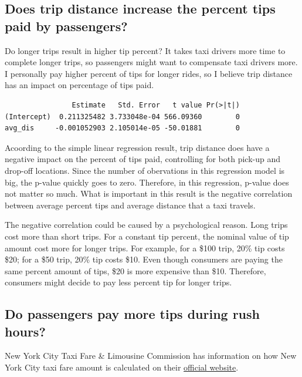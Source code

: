 \documentclass[12pt,twoside]{reedthesis}
\theoremstyle{definition}
\theoremstyle{definition}
\theoremstyle{definition}
\theoremstyle{remark}
\begin{document}
\subsection{Does trip distance increase the percent tips paid by
passengers?}\label{does-trip-distance-increase-the-percent-tips-paid-by-passengers}

Do longer trips result in higher tip percent? It takes taxi drivers more
time to complete longer trips, so passengers might want to compensate
taxi drivers more. I personally pay higher percent of tips for longer
rides, so I believe trip distance has an impact on percentage of tips
paid.
\begin{verbatim}
                Estimate   Std. Error   t value Pr(>|t|)
(Intercept)  0.211325482 3.733048e-04 566.09360        0
avg_dis     -0.001052903 2.105014e-05 -50.01881        0
\end{verbatim}
Acoording to the simple linear regression result, trip distance does
have a negative impact on the percent of tips paid, controlling for both
pick-up and drop-off locations. Since the number of obervations in this
regression model is big, the p-value quickly goes to zero. Therefore, in
this regression, p-value does not matter so much. What is important in
this result is the negative correlation between average percent tips and
average distance that a taxi travels.

The negative correlation could be caused by a psychological reason. Long
trips cost more than short trips. For a constant tip percent, the
nominal value of tip amount cost more for longer trips. For example, for
a \$100 trip, 20\% tip costs \$20; for a \$50 trip, 20\% tip costs \$10.
Even though consumers are paying the same percent amount of tips, \$20
is more expensive than \$10. Therefore, consumers might decide to pay
less percent tip for longer trips.

\subsection{Do passengers pay more tips during rush
hours?}\label{do-passengers-pay-more-tips-during-rush-hours}

New York City Taxi Fare \& Limousine Commission has information on how
New York City taxi fare amount is calculated on their
\href{http://www.nyc.gov/html/tlc/html/passenger/taxicab_rate.shtml}{official
website}.
\end{document}
